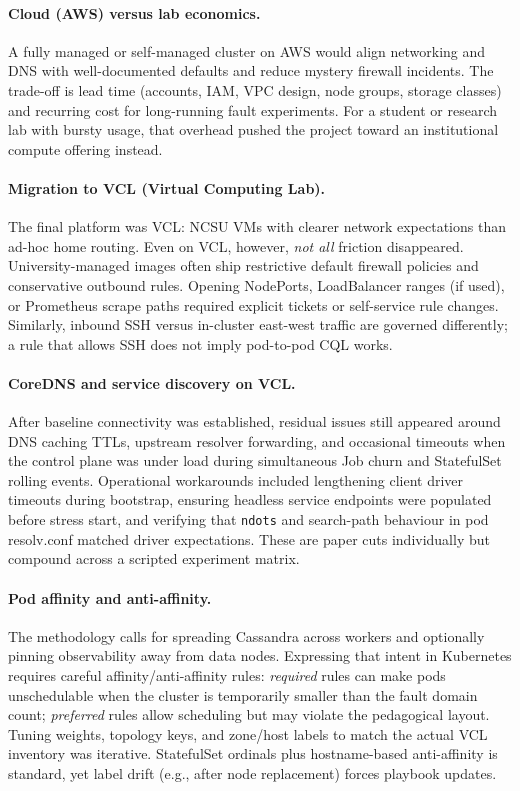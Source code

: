 \documentclass[sigconf]{acmart}
\begin{document}
\paragraph{Cloud (AWS) versus lab economics.}
A fully managed or self-managed cluster on AWS would align networking and DNS with well-documented defaults and reduce mystery firewall incidents. The trade-off is lead time (accounts, IAM, VPC design, node groups, storage classes) and recurring cost for long-running fault experiments. For a student or research lab with bursty usage, that overhead pushed the project toward an institutional compute offering instead.

\paragraph{Migration to VCL (Virtual Computing Lab).}
The final platform was VCL: NCSU VMs with clearer network expectations than ad-hoc home routing. Even on VCL, however, \emph{not all} friction disappeared. University-managed images often ship restrictive default firewall policies and conservative outbound rules. Opening NodePorts, LoadBalancer ranges (if used), or Prometheus scrape paths required explicit tickets or self-service rule changes. Similarly, inbound SSH versus in-cluster east-west traffic are governed differently; a rule that allows SSH does not imply pod-to-pod CQL works.

\paragraph{CoreDNS and service discovery on VCL.}
After baseline connectivity was established, residual issues still appeared around DNS caching TTLs, upstream resolver forwarding, and occasional timeouts when the control plane was under load during simultaneous Job churn and StatefulSet rolling events. Operational workarounds included lengthening client driver timeouts during bootstrap, ensuring headless service endpoints were populated before stress start, and verifying that \texttt{ndots} and search-path behaviour in pod resolv.conf matched driver expectations. These are paper cuts individually but compound across a scripted experiment matrix.

\paragraph{Pod affinity and anti-affinity.}
The methodology calls for spreading Cassandra across workers and optionally pinning observability away from data nodes. Expressing that intent in Kubernetes requires careful affinity/anti-affinity rules: \emph{required} rules can make pods unschedulable when the cluster is temporarily smaller than the fault domain count; \emph{preferred} rules allow scheduling but may violate the pedagogical layout. Tuning weights, topology keys, and zone/host labels to match the actual VCL inventory was iterative. StatefulSet ordinals plus hostname-based anti-affinity is standard, yet label drift (e.g., after node replacement) forces playbook updates.
\end{document}
